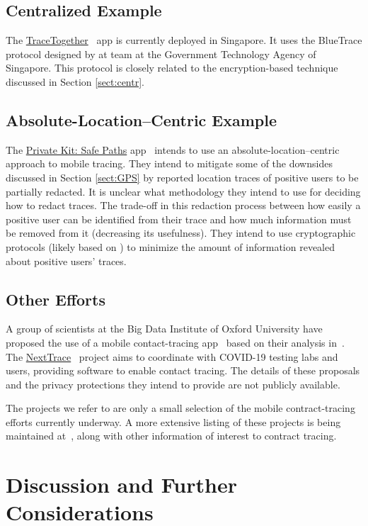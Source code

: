 \documentclass{article}
\begin{document}
\subsection{Centralized Example}
The \href{https://www.tracetogether.gov.sg/}{TraceTogether}~\cite{tracetogether} app is currently deployed in Singapore.
It uses the BlueTrace protocol designed by at team at the Government Technology Agency of Singapore.
This protocol is closely related to the encryption-based technique discussed in Section \ref{sect:centr}.

\subsection{Absolute-Location--Centric Example}
The \href{http://safepaths.mit.edu/}{Private Kit: Safe Paths} app~\cite{safepaths,safepaths2} intends to use an absolute-location--centric approach to mobile tracing.
They intend to mitigate some of the downsides discussed in Section \ref{sect:GPS} by reported location traces of positive users to be partially redacted.
It is unclear what methodology they intend to use for deciding how to redact traces. The trade-off in this redaction process between how easily a positive user can be identified from their trace and how much information must be removed from it (decreasing its usefulness). 
They intend to use cryptographic protocols (likely based on \cite{safepathsmaybe}) to minimize the amount of information revealed about positive users' traces.

\subsection{Other Efforts}
A group of scientists at the Big Data Institute of Oxford University have proposed the use of a mobile contact-tracing app~\cite{oxford,oxford2} based on their analysis in~\cite{oxford3}.
The \href{https://nexttrace.org/}{NextTrace}~\cite{nexttrace} project aims to coordinate with COVID-19 testing labs and users, providing software to enable contact tracing.
The details of these proposals and the privacy protections they intend to provide are not publicly available.

The projects we refer to are only a small selection of the mobile contract-tracing efforts currently underway.
A more extensive listing of these projects is being maintained at~\cite{gdoc}, along with other information of interest to contract tracing.

\section{Discussion and Further Considerations}
\end{document}
